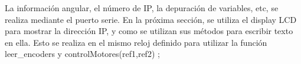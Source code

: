 %
%
%
%


%
%
%	
%
%
%		
%		
%	
%
%
La información angular, el número de IP, la depuración de variables, etc, se realiza mediante el puerto serie. En la próxima sección, se utiliza el display LCD para mostrar la dirección IP, y como se utilizan sus métodos para escribir texto en ella. Esto se realiza en el mismo reloj definido para utilizar la función leer\_encoders y controlMotores(ref1,ref2) ; 

